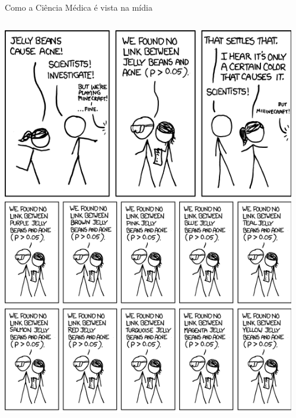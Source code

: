 \documentclass{beamer}
\begin{document}
\begin{frame}{{\small Como a Ciência Médica é vista na mídia}}
  \begin{columns}
    \begin{column}{5cm}
      \begin{center}
        \includegraphics[height=.8\textheight]{Cap10-11/xkcd-significant1}
      \end{center}
    \end{column}
    \begin{column}{5cm}
      \begin{center}

\end{center}
\end{column}
\end{columns}
\end{frame}
\end{document}
